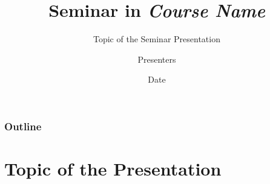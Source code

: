 \documentclass[handout,compress]{beamer} %
\title%
{Seminar in \emph{Course Name}}
\subtitle{Topic of the Seminar Presentation} %
\author[]{Presenters} %
\institute[KT AGH]{Department of Telecommunications}%
\date{Date} %
\begin{document}
\begin{frame}
    \titlepage
    \nobibliography* %
\end{frame}


\renewcommand{\logosinfootline}{\raisebox{0.12cm}{\begin{beamercolorbox}{rafi}{Seminar \quad Topic (change, please!) \hfill \insertframenumber/\inserttotalframenumber}\end{beamercolorbox}}}

\begin{frame}[allowframebreaks]
    \frametitle{Outline}
    \tableofcontents
\end{frame}



\section{Topic of the Presentation} %
\end{document}
